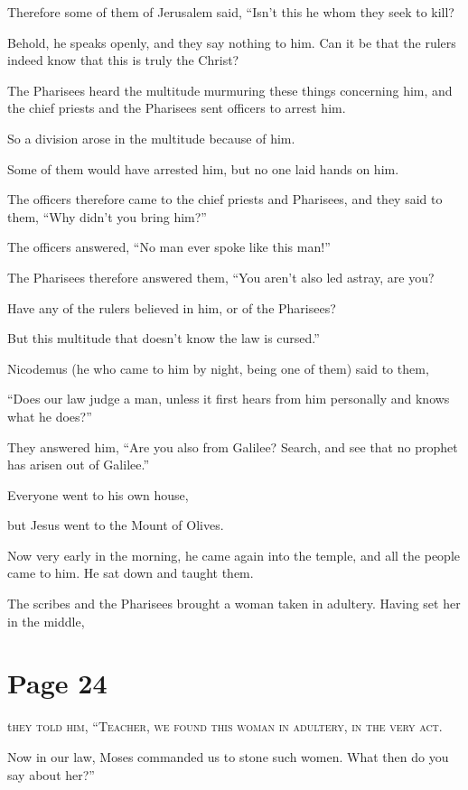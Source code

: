 Therefore some of them of Jerusalem said, “Isn’t this he whom they seek to kill?

Behold, he speaks openly, and they say nothing to him. Can it be that the rulers indeed know that this is truly the Christ?

The Pharisees heard the multitude murmuring these things concerning him, and the chief priests and the Pharisees sent officers to arrest him.

So a division arose in the multitude because of him.

Some of them would have arrested him, but no one laid hands on him.

The officers therefore came to the chief priests and Pharisees, and they said to them, “Why didn’t you bring him?”

The officers answered, “No man ever spoke like this man!”

The Pharisees therefore answered them, “You aren’t also led astray, are you?

Have any of the rulers believed in him, or of the Pharisees?

But this multitude that doesn’t know the law is cursed.”

Nicodemus (he who came to him by night, being one of them) said to them,

“Does our law judge a man, unless it first hears from him personally and knows what he does?”

They answered him, “Are you also from Galilee? Search, and see that no prophet has arisen out of Galilee.”

Everyone went to his own house,

but Jesus went to the Mount of Olives.

Now very early in the morning, he came again into the temple, and all the people came to him. He sat down and taught them.

The scribes and the Pharisees brought a woman taken in adultery. Having set her in the middle,



\chapterornament
\section*{Page 24}

\lettrine{t}{hey told him, “Teacher, we found this woman in adultery, in the very act.}

Now in our law, Moses commanded us to stone such women. What then do you say about her?”

